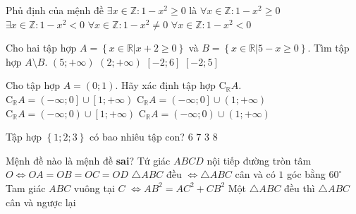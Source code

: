 \begin{ex}%
	Phủ định của mệnh đề  $\exists x\in\mathbb{Z}:1-x^2\geq 0$ là
	\choice
	{$\forall x\in\mathbb{Z}:1-x^2\geq 0$}
	{$\exists x\in\mathbb{Z}:1-x^2< 0$}
	{$\forall x\in\mathbb{Z}:1-x^2\neq 0$}
	{\True $\forall x\in\mathbb{Z}:1-x^2<0$}
	\loigiai{
	}
\end{ex}

\begin{ex}%
	Cho hai tập hợp $A=\left\{ x\in \mathbb{R}\big| x+2\geq 0 \right\}$ và $B=\left\{ x\in \mathbb{R}\big| 5-x\geq 0 \right\}$. Tìm tập hợp $A \setminus B$.
	\choice
	{\True $\left( 5;+\infty  \right)$}
	{$\left( 2;+\infty  \right)$}
	{$\left[ -2;6 \right]$}
	{$\left[ -2;5 \right]$}
\end{ex}

\begin{ex}%
	Cho tập hợp $A=\left(0;1\right)$. Hãy xác định tập hợp $\mathrm{C}_{\mathbb{R}}A.$
	\choice
	{\True$\mathrm{C}_{\mathbb{R}}A=\left(-\infty;0\right]\cup\left[1;+\infty\right)$}
	{$\mathrm{C}_{\mathbb{R}}A=\left(-\infty;0\right]\cup\left(1;+\infty\right)$}
	{$\mathrm{C}_{\mathbb{R}}A=\left(-\infty;0\right)\cup\left[1;+\infty\right)$}
	{$\mathrm{C}_{\mathbb{R}}A=\left(-\infty;0\right)\cup\left(1;+\infty\right)$}
	\loigiai{
	}
\end{ex}

\begin{ex}%
	Tập hợp $\left\{1; 2; 3\right\}$ có bao nhiêu tập con?
	\choice
	{$6$}
	{$7$}
	{$3$}
	{\True $8$}
\end{ex}

\begin{ex}%
	Mệnh đề nào là mệnh đề \textbf{sai}?
	\choice
	{Tứ giác $ABCD$ nội tiếp đường tròn tâm $O\Leftrightarrow OA=OB=OC=OD$}
	{$\triangle ABC $ đều $\Leftrightarrow \triangle ABC$ cân và có $1$ góc bằng $60^\circ$ }
	{Tam giác $ABC$ vuông tại $C$ $\Leftrightarrow AB^2=AC^2+CB^2$}
	{\True Một $\triangle ABC$ đều thì $\triangle ABC$ cân và ngược lại }
	\loigiai{}
\end{ex}


